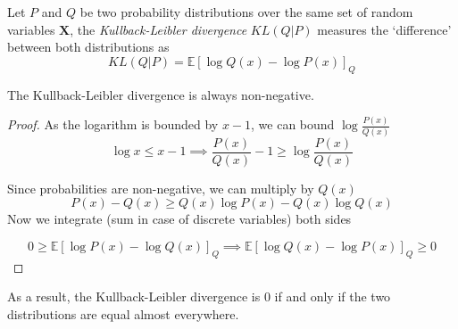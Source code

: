 \begin{definition}
  Let \(P\) and \(Q\) be two probability distributions over the same set of
  random variables \(\bm{X}\), the \emph{Kullback-Leibler divergence}
  \(KL(Q|P)\) measures the `difference' between both distributions as
  \[
    KL(Q|P) = \mathbb{E}[\log Q(x) - \log P(x)]_Q
  \]
\end{definition}

\begin{proposition}
The Kullback-Leibler divergence is always non-negative.
\end{proposition}
\begin{proof}
  As the logarithm is bounded by \(x - 1\), we can bound \(\log{\frac{P(x)}{Q(x)}}\)
  \[
    \log{x} \leq x - 1 \implies \frac{P(x)}{Q(x)} - 1 \geq \log{\frac{P(x)}{Q(x)}}
  \]

  Since probabilities are non-negative, we can multiply by \(Q(x)\)
  \[
    P(x) - Q(x) \geq Q(x) \log{P(x)} - Q(x) \log{Q(x)}
  \]
  Now we integrate (sum in case of discrete variables) both sides

  \[
    0 \geq \mathbb{E}[\log{P(x)} - \log{Q(x)}]_Q \implies \mathbb{E}[\log{Q(x)}
    - \log{P(x)}]_Q \geq 0
  \]
\end{proof}
As a result, the Kullback-Leibler divergence is \(0\) if and only if the two
distributions are equal almost everywhere.

